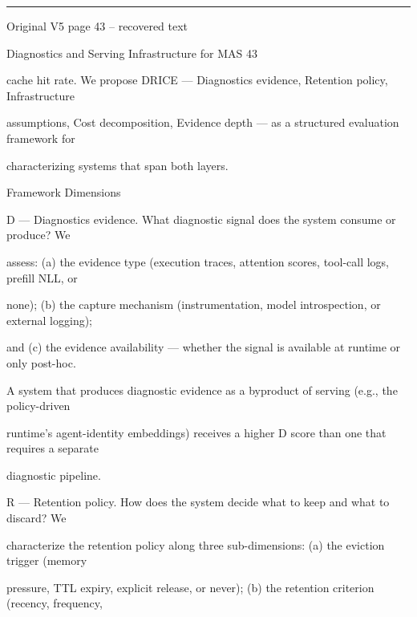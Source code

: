 \par\smallskip\noindent\rule{\textwidth}{0.4pt}\par{\sffamily\footnotesize Original V5 page 43 -- recovered text}\par\begin{flushleft}\footnotesize\ttfamily
\par\smallskip
\par\smallskip
\noindent Diagnostics and Serving Infrastructure for MAS 43\par
\par\smallskip
\par\smallskip
\par\smallskip
\noindent cache hit rate. We propose DRICE — Diagnostics evidence, Retention policy, Infrastructure\par
\noindent assumptions, Cost decomposition, Evidence depth — as a structured evaluation framework for\par
\noindent characterizing systems that span both layers.\par
\par\smallskip
{} Framework Dimensions\par
\noindent D — Diagnostics evidence. What diagnostic signal does the system consume or produce? We\par
\noindent assess: (a) the evidence type (execution traces, attention scores, tool-call logs, prefill NLL, or\par
\noindent none); (b) the capture mechanism (instrumentation, model introspection, or external logging);\par
\noindent and (c) the evidence availability — whether the signal is available at runtime or only post-hoc.\par
\noindent A system that produces diagnostic evidence as a byproduct of serving (e.g., the policy-driven\par
\noindent runtime’s agent-identity embeddings) receives a higher D score than one that requires a separate\par
\noindent diagnostic pipeline.\par
\par\smallskip
\noindent R — Retention policy. How does the system decide what to keep and what to discard? We\par
\noindent characterize the retention policy along three sub-dimensions: (a) the eviction trigger (memory\par
\noindent pressure, TTL expiry, explicit release, or never); (b) the retention criterion (recency, frequency,\par

\end{flushleft}
